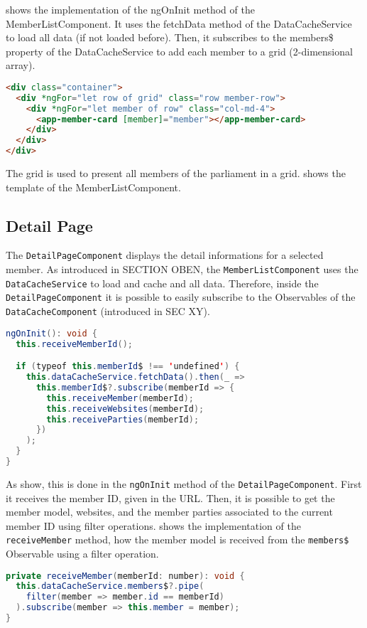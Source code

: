  shows the implementation of the ngOnInit method of the MemberListComponent. It uses the fetchData method of the DataCacheService to load all data (if not loaded before). Then, it subscribes to the members\$ property of the DataCacheService to add each member to a grid (2-dimensional array).

\begin{lstlisting}[label=lst:02_impl_memberlist_template, caption=\texttt{MemberService} implementation, language=HTML]
<div class="container">
  <div *ngFor="let row of grid" class="row member-row">
    <div *ngFor="let member of row" class="col-md-4">
      <app-member-card [member]="member"></app-member-card>
    </div>
  </div>
</div>
\end{lstlisting}
The grid is used to present all members of the parliament in a grid.  shows the template of the MemberListComponent.


\subsection{Detail Page}\label{subsec:02_impl_detail}
The \texttt{DetailPageComponent} displays the detail informations for a selected member.
As introduced in SECTION OBEN, the \texttt{MemberListComponent} uses the \texttt{DataCacheService} to load and cache and all data. Therefore, inside the \texttt{DetailPageComponent} it is possible to easily subscribe to the Observables of the \texttt{DataCacheComponent} (introduced in SEC XY).

\begin{lstlisting}[label=lst:02_impl_detail_ngoninit, caption=\texttt{MemberService} implementation, language=java]
ngOnInit(): void {
  this.receiveMemberId();

  if (typeof this.memberId$ !== 'undefined') {
    this.dataCacheService.fetchData().then(_ =>
      this.memberId$?.subscribe(memberId => {
        this.receiveMember(memberId);
        this.receiveWebsites(memberId);
        this.receiveParties(memberId);
      })
    );
  }
}
\end{lstlisting}
As  show, this is done in the \texttt{ngOnInit} method of the \texttt{DetailPageComponent}.
First it receives the member ID, given in the URL.
Then, it is possible to get the member model, websites, and the member parties associated to the current member ID using filter operations.  shows the implementation of the \texttt{receiveMember} method, how the member model is received from the \texttt{members\$} Observable using a filter operation.
\begin{lstlisting}[label=lst:02_impl_detail_receivemember, caption=\texttt{MemberService} implementation, language=java]
private receiveMember(memberId: number): void {
  this.dataCacheService.members$?.pipe(
    filter(member => member.id == memberId)
  ).subscribe(member => this.member = member);
}
\end{lstlisting}


